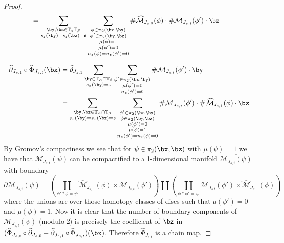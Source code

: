\begin{proof}
\begin{align*}
&= \sum_{\substack{\by,\bz \in \mathbb T_\alpha \mathbb T_\beta \\ s_z(\by)=s_z(\bz)=\mathfrak s}} \sum_{\substack{\phi \in \pi_2(\bx,\by) \\ \phi' \in \pi_2(\by,\bz) \\ \mu(\phi)=1 \\ \mu(\phi')=0 \\ n_z(\phi)=n_z(\phi')=0}} \# \widehat{\mathcal M}_{J_{s,0}}(\phi) \cdot \# \mathcal M_{J_{s,t}}(\phi') \cdot \bz 
\end{align*}

\begin{align*}
\widehat{\partial}_{J_{s,1}} \circ \widehat{\Phi}_{J_{s,t}}(\bx) &= \widehat{\partial}_{J_{s,1}} \sum_{\substack{\by \in \mathbb T_\alpha \cap \mathbb T_\beta \\ s_z(\by)=\mathfrak s}} \sum_{\substack{\phi' \in \pi_2(\bx,\by) \\ \mu(\phi')=0 \\ n_z(\phi')=0}} \# \mathcal M_{J_{s,t}}(\phi') \cdot \by \\
&= \sum_{\substack{\by,\bz \in \mathbb T_\alpha \cap \mathbb T_\beta \\ s_z(\by)=s_z(\bz)=\mathfrak s}} \sum_{\substack{\phi' \in \pi_2(\bx,\by) \\ \phi \in \pi_2(\by,\bz) \\ \mu(\phi')=0 \\ \mu(\phi)=1 \\ n_z(\phi')=n_z(\phi)=0}} \# \mathcal M_{J_{s,t}}(\phi') \cdot \# \widehat{\mathcal M}_{J_{s,1}}(\phi) \cdot \bz
\end{align*} 
By Gromov's compactness we see that for $\psi \in \pi_2(\bx,\bz)$ with $\mu(\psi)=1$ we have that $\mathcal M_{J_{s,t}}(\psi)$ can be compactified to a 1-dimensional manifold $\overline{\mathcal M_{J_{s,t}}(\psi)}$ with boundary
\[ \partial \overline{\mathcal M_{J_{s,t}}(\psi)} = \left( \coprod_{\phi' * \phi = \psi} \widehat{\mathcal M}_{J_{s,0}}(\phi) \times \mathcal M_{J_{s,t}}(\phi') \right) \coprod \left( \coprod_{\phi * \phi'=\psi} \mathcal M_{J_{s,t}}(\phi') \times \widehat{\mathcal M}_{J_{s,1}}(\phi) \right) \]
where the unions are over those homotopy classes of discs such that $\mu(\phi')=0$ and $\mu(\phi)=1$. Now it is clear that the number of boundary components of $\overline{\mathcal M_{J_{s,t}}(\psi)}$ (modulo 2) is precisely the coefficient of $\bz$ in $(\widehat{\Phi}_{J_{s,t}} \circ \widehat{\partial}_{J_{s,0}} - \widehat{\partial}_{J_{s,1}} \circ \widehat{\Phi}_{J_{s,t}})(\bx)$. Therefore $\widehat{\Phi}_{J_{s,t}}$ is a chain map.


\end{proof}
